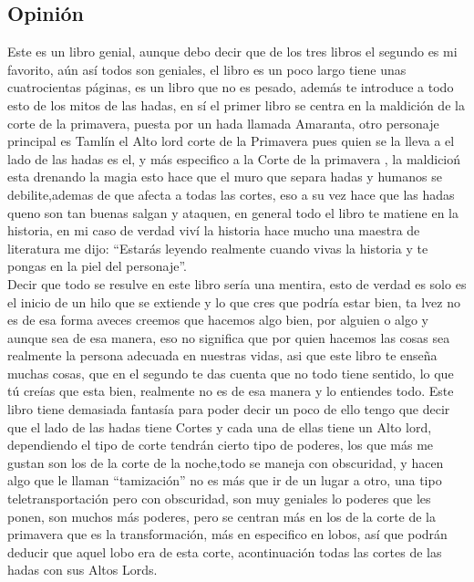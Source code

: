 \documentclass[12pt]{report}
\begin{document}
\subsection*{Opinión}
Este es un libro genial, aunque debo decir que de los tres libros el segundo es mi favorito, aún así todos son geniales, el libro es un poco largo
tiene unas cuatrocientas páginas, es un libro que no es pesado, además te introduce a todo esto de los mitos de las hadas, en sí el primer libro
se centra en la maldición de la corte de la primavera, puesta por un hada llamada Amaranta, otro personaje principal es Tamlín el Alto lord
corte de la Primavera pues quien se la lleva a el lado de las hadas es el, y más especifico a la Corte de la primavera
, la maldicioń esta drenando la magia esto hace que el muro que separa hadas y humanos se debilite,ademas de que afecta a todas las cortes,
eso a su vez hace que las hadas queno son tan buenas salgan y ataquen, en general todo el libro te matiene en la historia,
en mi caso de verdad viví la historia hace mucho una maestra de literatura me dijo:
``Estarás leyendo realmente cuando vivas la historia y te pongas en la piel del personaje''.\\[1mm]
Decir que  todo se resulve en este libro sería una mentira, esto de verdad es solo es el inicio de un hilo que se extiende
y lo que cres que podría estar bien, ta lvez no es de esa forma aveces creemos que hacemos algo bien, por alguien o algo y aunque
sea de esa manera, eso no significa que por quien hacemos las cosas sea realmente la persona adecuada en nuestras vidas,
asi que este libro te enseña muchas cosas, que en el segundo te das cuenta que no todo tiene sentido, lo que tú creías
que esta bien, realmente no es de esa manera y lo entiendes todo. Este libro tiene demasiada fantasía para poder decir un poco de ello tengo que decir que
el lado de las hadas tiene Cortes y cada una de ellas tiene un Alto lord, dependiendo el tipo de corte tendrán cierto tipo de poderes, los que más me gustan
son los de la corte de la noche,todo se maneja con obscuridad, y hacen algo que le llaman ``tamización'' no es más que ir de un lugar a otro, una tipo
teletransportación pero con obscuridad, son muy geniales lo poderes que les ponen, son muchos más poderes, pero se centran más en los de
la corte de la primavera que es la transformación, más en especifico en lobos, así que podrán deducir que aquel lobo era de esta corte, acontinuación
todas las cortes  de las hadas con sus Altos Lords.\\[2cm]
\end{document}
